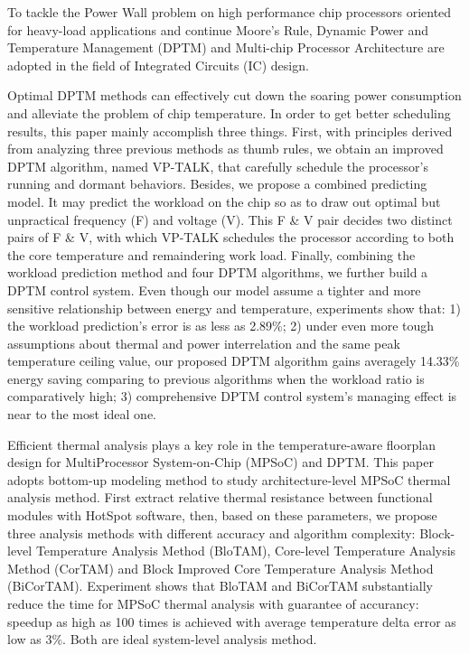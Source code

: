 
\begin{eabstract}


To tackle the Power Wall problem on high performance chip processors oriented for heavy-load applications and continue Moore's Rule, Dynamic Power and Temperature Management (DPTM) and Multi-chip Processor Architecture are adopted in the field of Integrated Circuits (IC) design.

Optimal DPTM methods can effectively cut down the soaring power consumption and alleviate the problem of chip temperature. In order to get better scheduling results, this paper mainly accomplish three things. First, with principles derived from analyzing three previous methods as thumb rules, we obtain an improved DPTM algorithm, named VP-TALK, that carefully schedule the processor's running and dormant behaviors. Besides, we propose a combined predicting model. It may predict the workload on the chip so as to draw out optimal but unpractical frequency (F) and voltage (V). This F \& V pair decides two distinct pairs of F \& V, with which VP-TALK schedules the processor according to both the core temperature and remaindering work load. Finally, combining the workload prediction method and four DPTM algorithms, we further build a DPTM control system. Even though our model assume a tighter and more sensitive relationship between energy and temperature, experiments show that: 1) the workload prediction's error is as less as 2.89\%; 2) under even more tough assumptions about thermal and power interrelation and the same peak temperature ceiling value, our proposed DPTM algorithm gains averagely 14.33\% energy saving comparing to previous algorithms when the workload ratio is comparatively high; 3) comprehensive DPTM control system's managing effect is near to the most ideal one.


Efficient thermal analysis plays a key role in the temperature-aware floorplan design for MultiProcessor System-on-Chip (MPSoC) and DPTM. This paper adopts bottom-up modeling method to study architecture-level MPSoC thermal analysis method. First extract relative thermal resistance between functional modules with HotSpot software, then, based on these parameters, we propose three analysis methods with different accuracy and algorithm complexity: Block-level Temperature Analysis Method (BloTAM), Core-level Temperature Analysis Method (CorTAM) and Block Improved Core Temperature Analysis Method (BiCorTAM). Experiment shows that BloTAM and BiCorTAM substantially reduce the time for MPSoC thermal analysis with guarantee of accurancy: speedup as high as 100 times is achieved with average temperature delta error as low as 3\%. Both are ideal system-level analysis method.

\end{eabstract}


